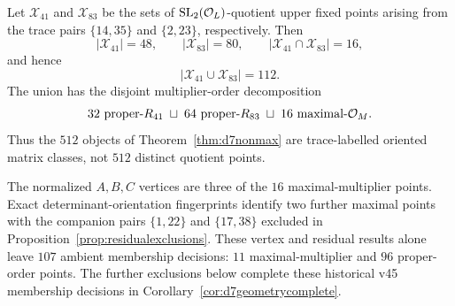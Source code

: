 \begin{theorem}[The $112$ ambient nonmaximal $d=7$ CM points]\label{thm:d7ambient}
Let $\mathcal X_{41}$ and $\mathcal X_{83}$ be the sets of
$\mathrm{SL}_2(\mathcal O_L)$-quotient upper fixed points arising from the trace pairs
$\{14,35\}$ and $\{2,23\}$, respectively.  Then
\[
 |\mathcal X_{41}|=48,\qquad |\mathcal X_{83}|=80,
 \qquad |\mathcal X_{41}\cap\mathcal X_{83}|=16,
\]
and hence
\[
 |\mathcal X_{41}\cup\mathcal X_{83}|=112.
\]
The union has the disjoint multiplier-order decomposition
\[
 32\text{ proper-}R_{41}
 \;\sqcup\;
 64\text{ proper-}R_{83}
 \;\sqcup\;
 16\text{ maximal-}\mathcal O_M.
\]
Thus the $512$ objects of Theorem~\ref{thm:d7nonmax} are trace-labelled
oriented matrix classes, not $512$ distinct quotient points.

The normalized $A,B,C$ vertices are three of the $16$ maximal-multiplier
points.  Exact determinant-orientation fingerprints identify two further
maximal points with the companion pairs $\{1,22\}$ and $\{17,38\}$ excluded
in Proposition~\ref{prop:residualexclusions}. These vertex and residual
results alone leave $107$ ambient membership decisions: $11$
maximal-multiplier and $96$ proper-order points. The further exclusions below complete these historical v45 membership
decisions in Corollary~\ref{cor:d7geometrycomplete}.
\end{theorem}
